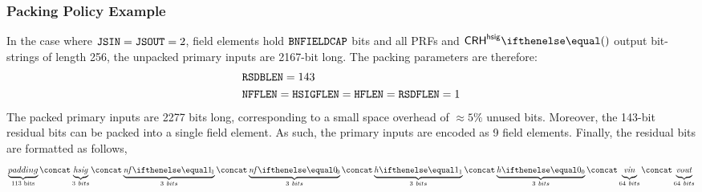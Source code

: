 \subsubsection{Packing Policy Example}

In the case where $\mathtt{JSIN}=\mathtt{JSOUT}=2$, field elements hold $\mathtt{BNFIELDCAP}$ bits and all PRFs and $\crhhsig{}$ output bit-strings of length 256, the unpacked primary inputs are 2167-bit long.
The packing parameters are therefore:
\begin{align*}
    & \mathtt{RSDBLEN} = 143 \\
    & \mathtt{NFFLEN} = \mathtt{HSIGFLEN} = \mathtt{HFLEN} = \mathtt{RSDFLEN} = 1
\end{align*}
The packed primary inputs are 2277 bits long, corresponding to a small space overhead of $\approx 5\%$ unused bits. Moreover, the 143-bit residual bits can be packed into a single field element. As such, the primary inputs are encoded as 9 field elements.
Finally, the residual bits are formatted as follows,
\[
    \underbrace{padding}_{\text{113 bits}}
    \concat \underbrace{\hsig}_{3\ bits}
    \concat \underbrace{\nf{1}}_{3\ bits}
    \concat \underbrace{\nf{0}}_{3\ bits}
    \concat \underbrace{\htag{1}}_{3\ bits}
    \concat \underbrace{\htag{0}}_{3\ bits}
    \concat \underbrace{\vin\vphantom{g}}_{64\ bits}
    \concat \underbrace{\vout\vphantom{g}}_{64\ bits}
\]
